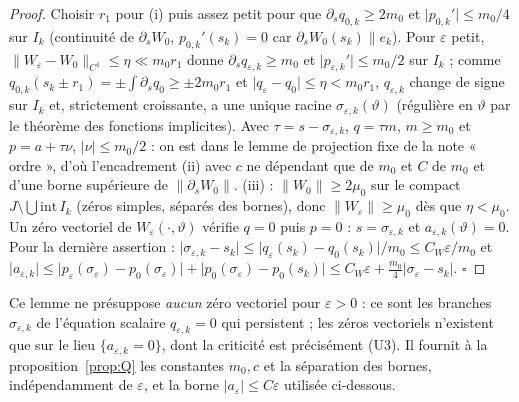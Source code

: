 \documentclass[11pt,a4paper]{article}
\theoremstyle{remark}
\newcommand{\vth}{\vartheta}
\begin{document}
\begin{proof}
Choisir $r_1$ pour (i) puis assez petit pour que $\partial_sq_{0,k}\ge2m_0$ et $\lvert p_{0,k}'\rvert\le m_0/4$ sur $I_k$ (continuité de $\partial_sW_0$, $p_{0,k}'(s_k)=0$ car $\partial_sW_0(s_k)\parallel e_k$). Pour $\varepsilon$ petit, $\lVert W_\varepsilon-W_0\rVert_{C^1}\le\eta\ll m_0r_1$ donne $\partial_sq_{\varepsilon,k}\ge m_0$ et $\lvert p_{\varepsilon,k}'\rvert\le m_0/2$ sur $I_k$ ; comme $q_{0,k}(s_k\pm r_1)=\pm\int\partial_sq_0\ge\pm2m_0r_1$ et $\lvert q_\varepsilon-q_0\rvert\le\eta<m_0r_1$, $q_{\varepsilon,k}$ change de signe sur $I_k$ et, strictement croissante, a une unique racine $\sigma_{\varepsilon,k}(\vth)$ (régulière en $\vth$ par le théorème des fonctions implicites). Avec $\tau=s-\sigma_{\varepsilon,k}$, $q=\tau m$, $m\ge m_0$ et $p=a+\tau\nu$, $\lvert\nu\rvert\le m_0/2$ : on est dans le lemme de projection fixe de la note « ordre », d'où l'encadrement (ii) avec $c$ ne dépendant que de $m_0$ et $C$ de $m_0$ et d'une borne supérieure de $\lVert\partial_sW_0\rVert$. (iii) : $\lVert W_0\rVert\ge2\mu_0$ sur le compact $J\setminus\bigcup\mathrm{int}\,I_k$ (zéros simples, séparés des bornes), donc $\lVert W_\varepsilon\rVert\ge\mu_0$ dès que $\eta<\mu_0$. Un zéro vectoriel de $W_\varepsilon(\cdot,\vth)$ vérifie $q=0$ puis $p=0$ : $s=\sigma_{\varepsilon,k}$ et $a_{\varepsilon,k}(\vth)=0$. Pour la dernière assertion : $\lvert\sigma_{\varepsilon,k}-s_k\rvert\le\lvert q_\varepsilon(s_k)-q_0(s_k)\rvert/m_0\le C_W\varepsilon/m_0$ et $\lvert a_{\varepsilon,k}\rvert\le\lvert p_\varepsilon(\sigma_\varepsilon)-p_0(\sigma_\varepsilon)\rvert+\lvert p_0(\sigma_\varepsilon)-p_0(s_k)\rvert\le C_W\varepsilon+\tfrac{m_0}{4}\lvert\sigma_\varepsilon-s_k\rvert$. $\square$
\end{proof}
\noindent Ce lemme ne présuppose \emph{aucun} zéro vectoriel pour $\varepsilon>0$ : ce sont les branches $\sigma_{\varepsilon,k}$ de l'équation scalaire $q_{\varepsilon,k}=0$ qui persistent ; les zéros vectoriels n'existent que sur le lieu $\{a_{\varepsilon,k}=0\}$, dont la criticité est précisément (U3). Il fournit à la proposition~\ref{prop:Q} les constantes $m_0,c$ et la séparation des bornes, indépendamment de $\varepsilon$, et la borne $\lvert a_\varepsilon\rvert\le C\varepsilon$ utilisée ci-dessous.
\end{document}
